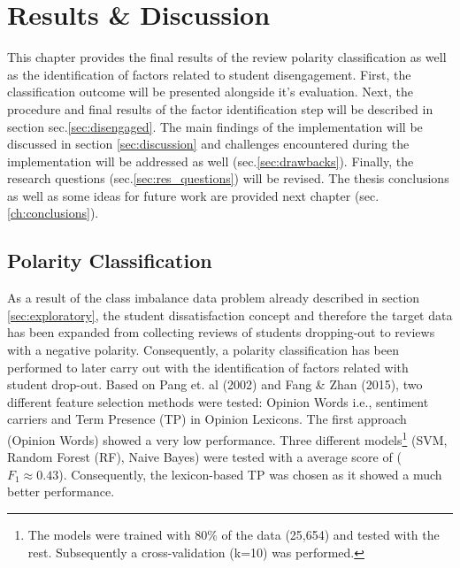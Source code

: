 \documentclass[
	a4paper,
	pdftex,
	12pt,	
	footinclude=true,
	fleqn,
	final,
	]{report}%
\begin{document}
\chapter{Results \& Discussion}
\vspace{-0.6cm}
\label{ch:discussion}
This chapter provides the final results of the review polarity classification 
as well as the identification of factors related to student disengagement.
First, the classification outcome will be presented alongside it's evaluation. 
Next, the procedure and final results of the factor identification step will 
be described in section sec.\ref{sec:disengaged}. The main findings of the 
implementation will be discussed in section \ref{sec:discussion} and 
challenges encountered 
during the implementation will be addressed as well (sec.\ref{sec:drawbacks}).
Finally, the research questions (sec.\ref{sec:res_questions}) 
will be revised. The thesis conclusions as well as some ideas for future work 
are provided next chapter (sec.\ref{ch:conclusions}).

\vspace{-0.45cm}
\section{Polarity Classification}
\label{sec:results}
\vspace{-0.3cm}
As a result of the class imbalance data problem already described in 
section \ref{sec:exploratory}, 
the student dissatisfaction concept and therefore the target data
has been expanded from collecting reviews of 
students dropping-out to reviews with a negative polarity. 
Consequently, a polarity classification 
has been performed to later carry out with the identification 
of factors related with student drop-out. 
Based on Pang et. al (2002) and Fang \& Zhan (2015), 
two different feature selection methods were tested:
Opinion Words i.e., sentiment carriers and 
Term Presence (TP) in Opinion Lexicons.
The first approach (Opinion Words) showed a very low 
performance. Three different models\footnote{
The models were trained with 80\% of the data (25,654)
and tested with the rest. Subsequently a cross-validation (k=10) 
was performed.} (SVM, Random Forest (RF), Naive Bayes) were tested
with a average score of ($F_{1} \approx 0.43$). Consequently, the 
lexicon-based TP was chosen as it showed a much better performance. 
\end{document}
